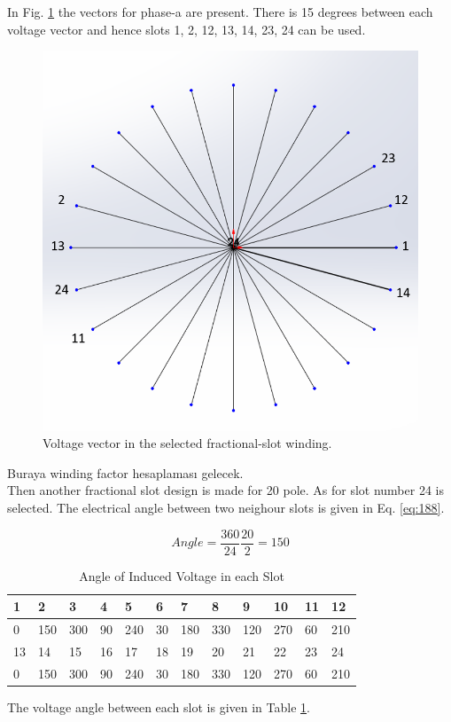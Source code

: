 \documentclass{article}
\begin{document}
In Fig. \ref{fig:22p24svoltage} the vectors for phase-a are present. There is 15 degrees between each voltage vector and hence slots 1, 2, 12, 13, 14, 23, 24 can be used.

\begin{figure}[H]
	\centering
	\includegraphics[width=0.7\linewidth]{Figurler/22p24s_voltage}
	\caption{Voltage vector in the selected fractional-slot winding.}
	\label{fig:22p24svoltage}
\end{figure}

 Buraya winding factor hesaplaması gelecek.\\

Then another fractional slot design is made for 20 pole. As for slot number 24 is selected. The electrical angle between two neighour slots is given in Eq. \ref{eq:188}.

\begin{equation}
Angle=\frac{360}{24}\frac{20}{2}=150
\label{eq:188}
\end{equation}

\begin{table}[H]
	\caption{Angle of Induced Voltage in each Slot}
	\label{tab:voltageangle20-24}
	\begin{tabular}{llllllllllll}
		1	&  2& 3 &4  & 5 & 6 & 7 & 8 & 9 & 10 & 11 & 12 \\
		\hline
		
		0&	150	&300&	90	&240&	30&	180&	330&	120&	270&	60&	210	\\
		\hline
		13	& 14 & 15 &16  &17  &18  &19  &20  &21  &22  &23  &24 \\
			\hline
		0&	150	&300&	90	&240&	30	&180&	330	&120&	270	&60	&210 
	
	\end{tabular}
\end{table}
The voltage angle between each slot is given in Table \ref{tab:voltageangle20-24}.
\end{document}
